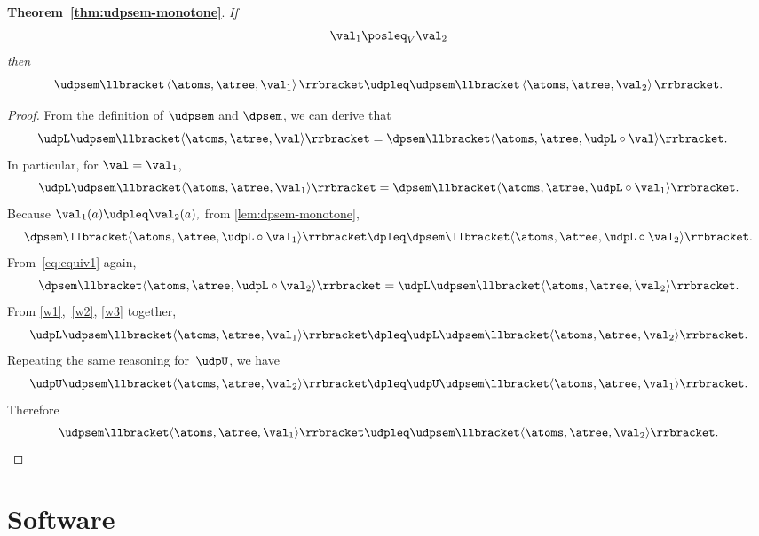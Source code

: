 \textbf{Theorem~\ref{thm:udpsem-monotone}}. \emph{If
  \[
    \val_{1}\posleq_{V}\val_{2}
  \]
  then
  \[
    \udpsem\llbracket\left\langle \atoms,\atree,\val_{1}\right\rangle \rrbracket\udpleq\udpsem\llbracket\left\langle \atoms,\atree,\val_{2}\right\rangle \rrbracket.
  \]
}
\begin{proof}
  From the definition of $\udpsem$ and $\dpsem$, we can derive that
  \begin{align}
    \udpL\udpsem\llbracket\langle\atoms,\atree,\val\rangle\rrbracket & =\dpsem\llbracket\langle\atoms,\atree,\udpL\circ\val\rangle\rrbracket.\label{eq:equiv1}
  \end{align}
  In particular, for $\val=\val_{1}$,
  \begin{equation}
    \udpL\udpsem\llbracket\langle\atoms,\atree,\val_{1}\rangle\rrbracket=\dpsem\llbracket\langle\atoms,\atree,\udpL\circ\val_{1}\rangle\rrbracket.\label{eq:w1}
  \end{equation}
  Because $\val_{1}(a)\udpleq\val_{2}(a),$ from \cref{lem:dpsem-monotone},
  \begin{equation}
    \dpsem\llbracket\langle\atoms,\atree,\udpL\circ\val_{1}\rangle\rrbracket\dpleq\dpsem\llbracket\langle\atoms,\atree,\udpL\circ\val_{2}\rangle\rrbracket.\label{eq:w2}
  \end{equation}
  From~\cref{eq:equiv1} again,
  \begin{equation}
    \dpsem\llbracket\langle\atoms,\atree,\udpL\circ\val_{2}\rangle\rrbracket=\udpL\udpsem\llbracket\langle\atoms,\atree,\val_{2}\rangle\rrbracket.\label{eq:w3}
  \end{equation}
  From \eqref{w1},~\eqref{w2}, \eqref{w3} together,
  \[
    \udpL\udpsem\llbracket\langle\atoms,\atree,\val_{1}\rangle\rrbracket\dpleq\udpL\udpsem\llbracket\langle\atoms,\atree,\val_{2}\rangle\rrbracket.
  \]
  Repeating the same reasoning for~$\udpU$, we have
  \[
    \udpU\udpsem\llbracket\langle\atoms,\atree,\val_{2}\rangle\rrbracket\dpleq\udpU\udpsem\llbracket\langle\atoms,\atree,\val_{1}\rangle\rrbracket.
  \]
  Therefore
  \[
    \udpsem\llbracket\langle\atoms,\atree,\val_{1}\rangle\rrbracket\udpleq\udpsem\llbracket\langle\atoms,\atree,\val_{2}\rangle\rrbracket.
  \]
\end{proof}

\vfill\pagebreak

\section{Software}

